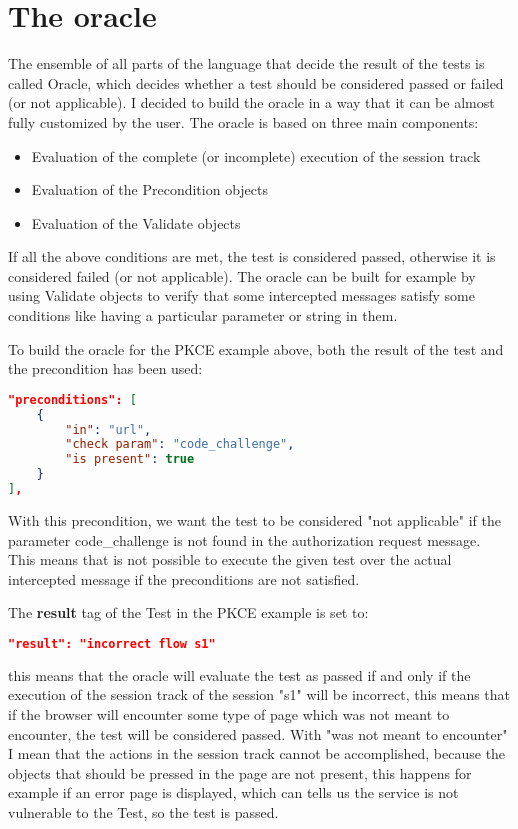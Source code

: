 \section{The oracle}
The ensemble of all parts of the language that decide the result of the tests is called Oracle,
which decides whether a test should be considered passed or failed (or not applicable). I decided to build the oracle in a way that it can be almost fully customized by the user. 
The oracle is based on three main components:
\begin{itemize}
    \item Evaluation of the complete (or incomplete) execution of the \gls{session track} 
    \item Evaluation of the Precondition objects
    \item Evaluation of the Validate objects
\end{itemize}
If all the above conditions are met, the test is considered passed, otherwise it is considered failed (or not applicable).
The oracle can be built for example by using Validate objects to verify that some intercepted messages satisfy some conditions like having a particular parameter or string in them.

To build the oracle for the PKCE example above, both the result of the test and the precondition has been used:
\begin{lstlisting}[language=json, caption=Precondition definition]
"preconditions": [
    {
        "in": "url",
        "check param": "code_challenge",
        "is present": true
    }
],
\end{lstlisting}
With this precondition, we want the test to be considered "not applicable" if the parameter code\_challenge is not found in the authorization request message. This means that is not possible to execute the given test over the actual intercepted message if the preconditions are not satisfied.

The \textbf{result} tag of the Test in the PKCE example is set to:
\begin{lstlisting}[language=json]
"result": "incorrect flow s1"
\end{lstlisting}
this means that the oracle will evaluate the test as passed if and only if the execution of the \gls{session track} of the session "s1" will be incorrect, this means that if the browser will encounter some type of page which was not meant to encounter, the test will be considered passed. With "was not meant to encounter" I mean that the actions in the \gls{session track} cannot be accomplished, because the objects that should be pressed in the page are not present, this happens for example if an error page is displayed, which can tells us the service is not vulnerable to the Test, so the test is passed.

